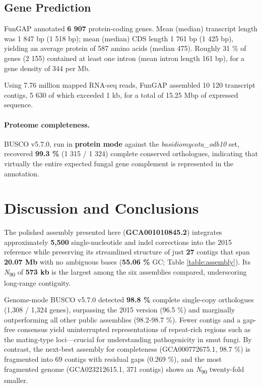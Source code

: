 \documentclass[Journal,letterpaper]{ascelike-new}
\begin{document}
\subsection*{Gene Prediction}

FunGAP annotated \textbf{6 907} protein-coding genes. Mean (median) transcript length was 1 847 bp (1 518 bp); mean (median) CDS length 1 761 bp (1 425 bp), yielding an average protein of 587 amino acids (median 475). Roughly 31 \% of genes (2 155) contained at least one intron (mean intron length 161 bp), for a gene density of 344 per Mb.

Using 7.76 million mapped RNA-seq reads, FunGAP assembled 10 120 transcript contigs, 5 630 of which exceeded 1 kb, for a total of 15.25 Mbp of expressed sequence.

\paragraph{Proteome completeness.} BUSCO v5.7.0, run in \textbf{protein mode} against the \textit{basidiomycota\_odb10} set, recovered \textbf{99.3 \%} (1 315 / 1 324) complete conserved orthologues, indicating that virtually the entire expected fungal gene complement is represented in the annotation.


\section*{Discussion and Conclusions}

The polished assembly presented here (\textbf{GCA001010845.2}) integrates approximately \textbf{5,500} single-nucleotide and indel corrections into the 2015 reference while preserving its streamlined structure of just \textbf{27} contigs that span \textbf{20.07 Mb} with no ambiguous bases (\textbf{55.06 \%} GC; Table \ref{table:assembly}). Its \textit{N}\textsubscript{90} of \textbf{573 kb} is the largest among the six assemblies compared, underscoring long-range contiguity.

Genome-mode BUSCO v5.7.0 detected \textbf{98.8 \%} complete single-copy orthologues (1,308 / 1,324 genes), surpassing the 2015 version (96.5 \%) and marginally outperforming all other public assemblies (98.2-98.7 \%). Fewer contigs and a gap-free consensus yield uninterrupted representations of repeat-rich regions such as the mating-type loci—crucial for understanding pathogenicity in smut fungi. By contrast, the next-best assembly for completeness (GCA000772675.1, 98.7 \%) is fragmented into 69 contigs with residual gaps (0.269 \%), and the most fragmented genome (GCA023212615.1, 371 contigs) shows an \textit{N}\textsubscript{90} twenty-fold smaller.
\end{document}
